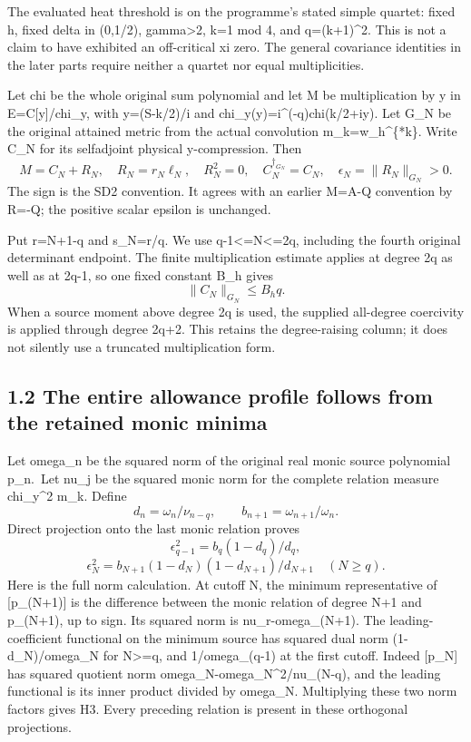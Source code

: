 The evaluated heat threshold is on the programme's stated simple quartet: fixed h, fixed delta in (0,1/2), gamma\textgreater2, k=1 mod 4, and q=(k+1)\^{}2. This is not a claim to have exhibited an off-critical xi zero. The general covariance identities in the later parts require neither a quartet nor equal multiplicities.

Let chi be the whole original sum polynomial and let M be multiplication by y in E=C{[}y{]}/chi\_y, with y=(S-k/2)/i and chi\_y(y)=i\^{}(-q)chi(k/2+iy). Let G\_N be the original attained metric from the actual convolution m\_k=w\_h\^{}\{*k\}. Write C\_N for its selfadjoint physical y-compression. Then \[
 M=C_N+R_N,\quad R_N=r_N\ell_N,\quad R_N^2=0,\quad
 C_N^{\dagger_{G_N}}=C_N,\quad \epsilon_N=\|R_N\|_{G_N}>0.
 \tag{H1}
\] The sign is the SD2 convention. It agrees with an earlier M=A-Q convention by R=-Q; the positive scalar epsilon is unchanged.

Put r=N+1-q and s\_N=r/q. We use q-1\textless=N\textless=2q, including the fourth original determinant endpoint. The finite multiplication estimate applies at degree 2q as well as at 2q-1, so one fixed constant B\_h gives \[
 \|C_N\|_{G_N}\le B_hq.
 \tag{H2}
\] When a source moment above degree 2q is used, the supplied all-degree coercivity is applied through degree 2q+2. This retains the degree-raising column; it does not silently use a truncated multiplication form.

\subsection{1.2 The entire allowance profile follows from the retained monic minima}\label{the-entire-allowance-profile-follows-from-the-retained-monic-minima}

Let omega\_n be the squared norm of the original real monic source polynomial p\_n.~Let nu\_j be the squared monic norm for the complete relation measure chi\_y\^{}2 m\_k. Define \[
 d_n=\omega_n/\nu_{n-q},\qquad b_{n+1}=\omega_{n+1}/\omega_n.
\] Direct projection onto the last monic relation proves \[
 \epsilon_{q-1}^2=b_q(1-d_q)/d_q,
\] \[
 \epsilon_N^2=b_{N+1}(1-d_N)(1-d_{N+1})/d_{N+1}\quad(N\ge q).
 \tag{H3}
\] Here is the full norm calculation. At cutoff N, the minimum representative of {[}p\_(N+1){]} is the difference between the monic relation of degree N+1 and p\_(N+1), up to sign. Its squared norm is nu\_r-omega\_(N+1). The leading-coefficient functional on the minimum source has squared dual norm (1-d\_N)/omega\_N for N\textgreater=q, and 1/omega\_(q-1) at the first cutoff. Indeed {[}p\_N{]} has squared quotient norm omega\_N-omega\_N\^{}2/nu\_(N-q), and the leading functional is its inner product divided by omega\_N. Multiplying these two norm factors gives H3. Every preceding relation is present in these orthogonal projections.

